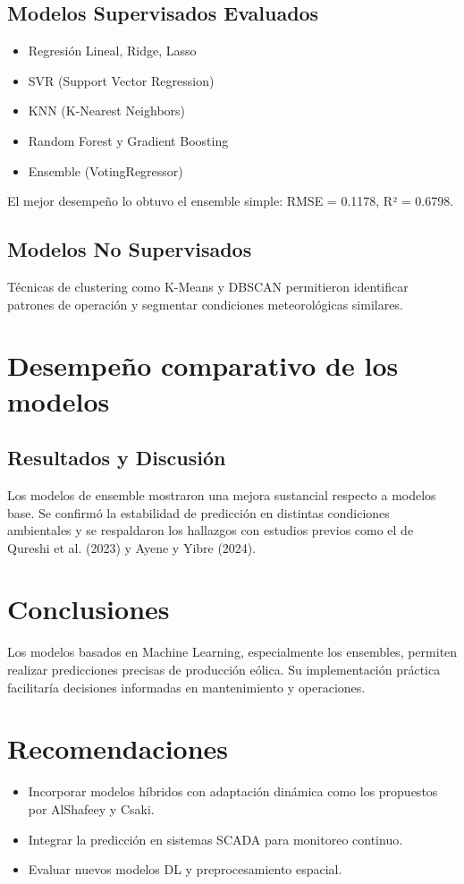 \documentclass[conference]{IEEEtran}
\begin{document}
	\subsection{Modelos Supervisados Evaluados}
	\begin{itemize}
		\item Regresión Lineal, Ridge, Lasso
		\item SVR (Support Vector Regression)
		\item KNN (K-Nearest Neighbors)
		\item Random Forest y Gradient Boosting
		\item Ensemble (VotingRegressor)
	\end{itemize}
	El mejor desempeño lo obtuvo el ensemble simple: RMSE = 0.1178, R² = 0.6798.
	
	\subsection{Modelos No Supervisados}
	Técnicas de clustering como K-Means y DBSCAN permitieron identificar patrones de operación y segmentar condiciones meteorológicas similares.
	
	\section{Desempeño comparativo de los modelos}
	\subsection{Resultados y Discusión}
	Los modelos de ensemble mostraron una mejora sustancial respecto a modelos base. Se confirmó la estabilidad de predicción en distintas condiciones ambientales y se respaldaron los hallazgos con estudios previos como el de Qureshi et al. (2023) y Ayene y Yibre (2024).
	
	\section{Conclusiones}
	Los modelos basados en Machine Learning, especialmente los ensembles, permiten realizar predicciones precisas de producción eólica. Su implementación práctica facilitaría decisiones informadas en mantenimiento y operaciones.
	
	\section{Recomendaciones}
	\begin{itemize}
		\item Incorporar modelos híbridos con adaptación dinámica como los propuestos por AlShafeey y Csaki.
		\item Integrar la predicción en sistemas SCADA para monitoreo continuo.
		\item Evaluar nuevos modelos DL y preprocesamiento espacial.
	\end{itemize}
	
	
	
	
\end{document}
